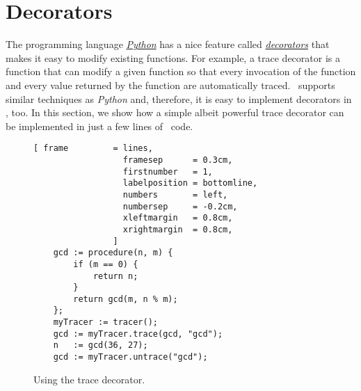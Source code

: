 \section{Decorators}
The programming language \href{https://www.python.org}{\textsl{Python}} has a nice feature called 
\href{http://en.wikipedia.org/wiki/Python_syntax_and_semantics#Decorators}{\emph{decorators}} that
makes it easy to modify existing functions.  For example, a trace decorator is a function that can
modify a given function so that every invocation of the function and every value returned by the
function are automatically traced.  \setlx\ supports similar techniques as \textsl{Python} and,
therefore, it is easy to implement decorators in \setlx, too.  In this section, we show how a simple
albeit powerful trace decorator can be implemented in just a few lines of \setlx\ code.

\begin{figure}[!ht]
\centering
\begin{Verbatim}[ frame         = lines, 
                  framesep      = 0.3cm, 
                  firstnumber   = 1,
                  labelposition = bottomline,
                  numbers       = left,
                  numbersep     = -0.2cm,
                  xleftmargin   = 0.8cm,
                  xrightmargin  = 0.8cm,
                ]
    gcd := procedure(n, m) {
        if (m == 0) {
            return n;
        }
        return gcd(m, n % m);
    };
    myTracer := tracer();
    gcd := myTracer.trace(gcd, "gcd");
    n   := gcd(36, 27);
    gcd := myTracer.untrace("gcd");
\end{Verbatim}
\vspace*{-0.3cm}
\caption{Using the trace decorator.}
\label{fig:tarce-decorator-use.stlx}
\end{figure}

